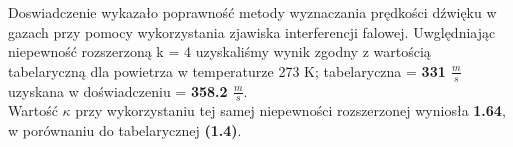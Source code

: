 \documentclass{article}
\begin{document}
Doswiadczenie wykazało poprawność metody wyznaczania prędkości dźwięku w gazach przy pomocy wykorzystania zjawiska interferencji falowej.
Uwględniając niepewność rozszerzoną k = 4 uzyskaliśmy wynik zgodny z wartością tabelaryczną dla powietrza w temperaturze 273 K;
tabelaryczna = \textbf{331 $\frac{m}{s}$} uzyskana w doświadczeniu = \textbf{\textbf{358.2} $\frac{m}{s}$}. 
\\
Wartość $\kappa$ przy wykorzystaniu tej samej niepewności rozszerzonej wyniosła \textbf{1.64}, w porównaniu do tabelarycznej \textbf{(1.4)}.






\end{document}

